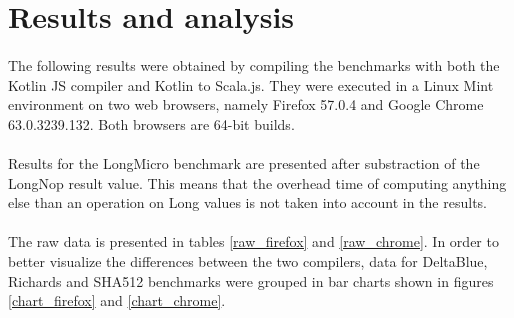 
\section{Results and analysis}

\paragraph{} The following results were obtained by compiling the benchmarks with both the Kotlin 
JS compiler and Kotlin to Scala.js. They were executed in a Linux Mint environment on two web 
browsers, namely Firefox 57.0.4 and Google Chrome 63.0.3239.132. Both browsers are 64-bit builds.

\paragraph{} Results for the LongMicro benchmark are presented after substraction of the LongNop result value. This means that the overhead time of computing anything else than an operation on Long values is not taken into account in the results.

\paragraph{} The raw data is presented in tables \ref{raw_firefox} and \ref{raw_chrome}. In order to better visualize the differences between the two compilers, data for DeltaBlue, Richards and SHA512 benchmarks were grouped in bar charts shown in figures \ref{chart_firefox} and \ref{chart_chrome}.

